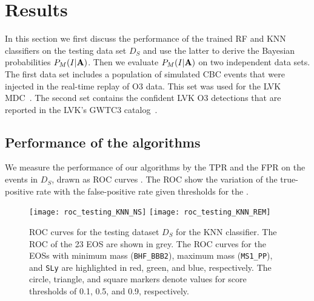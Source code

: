 \section{Results} \label{results}

In this section we first discuss the performance of the trained \ac{RF} and \ac{KNN} classifiers on the testing data set $D_S$ and use the latter to derive the Bayesian probabilities $P_M(I|{\bf
A})$. Then we evaluate $P_M(I|{\bf A})$ on two independent data sets. The first data set includes a population of simulated \ac{CBC} events that were injected in the real-time replay of \ac{O3} data. This set was used for the \ac{LVK} \ac{MDC}~\cite{Chaudhary:2023vec}. The second set contains the confident \ac{LVK} \ac{O3} detections that are reported in the \ac{LVK}'s \ac{GWTC3}
catalog~\cite{LIGOScientific:2021djp}.

\subsection{Performance of the algorithms}

We measure the performance of our algorithms by the \ac{TPR} and the \ac{FPR} on the events in $D_S$, drawn as \ac{ROC} curves . The \ac{ROC} show the variation of the true-positive rate with the false-positive rate given thresholds for the .  

\begin{figure}[h]
\texttt{[image: roc\_testing\_KNN\_NS]}
\texttt{[image: roc\_testing\_KNN\_REM]}
\caption{\ac{ROC} curves for the testing dataset $D_S$ for the \ac{KNN} classifier. The \ac{ROC} of the 23 \ac{EOS} are shown in grey. The \ac{ROC} curves for the \ac{EOS}s with minimum mass ({\tt BHF\_BBB2}), maximum mass ({\tt MS1\_PP}), and {\tt SLy} are highlighted in red, green, and blue, respectively. The circle, triangle, and square markers denote values for score thresholds of 0.1, 0.5, and 0.9, respectively.}
\label{fig:rocO2_KNN}
\end{figure}

